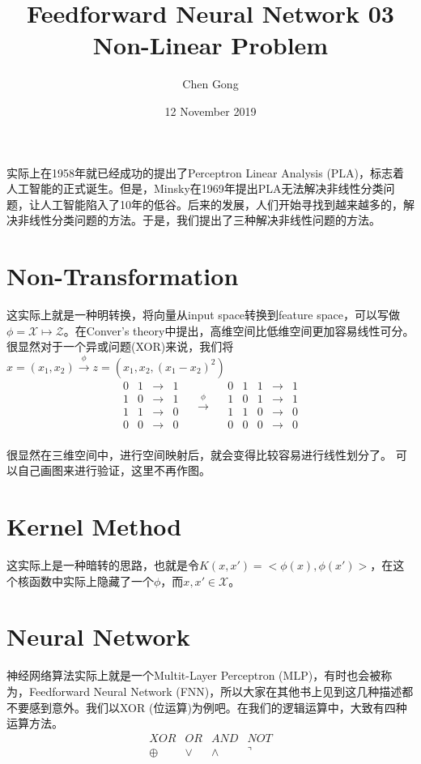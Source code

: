 \documentclass[a4paper]{article}
\title{Feedforward Neural Network 03 Non-Linear Problem}
\author{Chen Gong}
\date{12 November 2019}
\begin{document}
\maketitle
实际上在1958年就已经成功的提出了Perceptron Linear Analysis (PLA)，标志着人工智能的正式诞生。但是，Minsky在1969年提出PLA无法解决非线性分类问题，让人工智能陷入了10年的低谷。后来的发展，人们开始寻找到越来越多的，解决非线性分类问题的方法。于是，我们提出了三种解决非线性问题的方法。

\section{Non-Transformation}
这实际上就是一种明转换，将向量从input space转换到feature space，可以写做$\phi = \mathcal{X}\longmapsto\mathcal{Z}$。在Conver’s theory中提出，高维空间比低维空间更加容易线性可分。很显然对于一个异或问题(XOR)来说，我们将$x=(x_1,x_2)\stackrel{\phi}{\longrightarrow}z=(x_1,x_2,(x_1-x_2)^2)$
\begin{equation}
    \begin{matrix}
        0 & 1 & \longrightarrow & 1 \\
        1 & 0 & \longrightarrow & 1 \\
        1 & 1 & \longrightarrow & 0 \\
        0 & 0 & \longrightarrow & 0 \\
    \end{matrix}
    \quad
    \stackrel{\phi}{\longrightarrow}
    \quad
    \begin{matrix}
        0 & 1 & 1 & \longrightarrow & 1 \\
        1 & 0 & 1 & \longrightarrow & 1 \\
        1 & 1 & 0 & \longrightarrow & 0 \\
        0 & 0 & 0 & \longrightarrow & 0 \\
    \end{matrix}
\end{equation}

很显然在三维空间中，进行空间映射后，就会变得比较容易进行线性划分了。
可以自己画图来进行验证，这里不再作图。

\section{Kernel Method}
这实际上是一种暗转的思路，也就是令$K(x,x')=<\phi(x),\phi(x')>$，在这个核函数中实际上隐藏了一个$\phi$，而$x,x'\in \mathcal{X}$。

\section{Neural Network}
神经网络算法实际上就是一个Multit-Layer Perceptron (MLP)，有时也会被称为，Feedforward Neural Network (FNN)，所以大家在其他书上见到这几种描述都不要感到意外。我们以XOR (位运算)为例吧。在我们的逻辑运算中，大致有四种运算方法。
\begin{equation}
    \begin{matrix}
        XOR & OR & AND & NOT \\
        \oplus & \vee & \wedge & \urcorner \\
    \end{matrix}
\end{equation}
\end{document}
